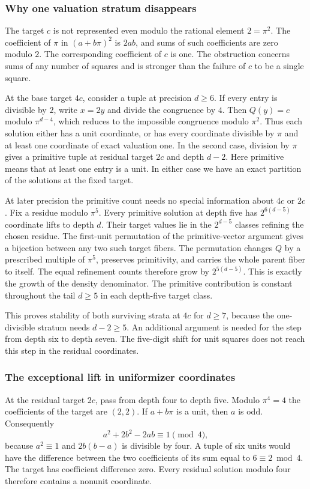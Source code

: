 \documentclass[12pt,letterpaper]{article}
\begin{document}
\subsubsection{Why one valuation stratum disappears}
The target $c$ is not represented even modulo the rational element $2=\pi^2$. The coefficient of $\pi$ in $(a+b\pi)^2$ is $2ab$, and sums of such coefficients are zero modulo $2$. The corresponding coefficient of $c$ is one. The obstruction concerns sums of any number of squares and is stronger than the failure of $c$ to be a single square.

At the base target $4c$, consider a tuple at precision $d\geq 6$. If every entry is divisible by $2$, write $x=2y$ and divide the congruence by $4$. Then $Q(y)=c$ modulo $\pi^{d-4}$, which reduces to the impossible congruence modulo $\pi^2$. Thus each solution either has a unit coordinate, or has every coordinate divisible by $\pi$ and at least one coordinate of exact valuation one. In the second case, division by $\pi$ gives a primitive tuple at residual target $2c$ and depth $d-2$. Here primitive means that at least one entry is a unit. In either case we have an exact partition of the solutions at the fixed target.

At later precision the primitive count needs no special information about $4c$ or $2c$. Fix a residue modulo $\pi^5$. Every primitive solution at depth five has $2^{6(d-5)}$ coordinate lifts to depth $d$. Their target values lie in the $2^{d-5}$ classes refining the chosen residue. The first-unit permutation of the primitive-vector argument gives a bijection between any two such target fibers. The permutation changes $Q$ by a prescribed multiple of $\pi^5$, preserves primitivity, and carries the whole parent fiber to itself. The equal refinement counts therefore grow by $2^{5(d-5)}$. This is exactly the growth of the density denominator. The primitive contribution is constant throughout the tail $d\geq 5$ in each depth-five target class.

This proves stability of both surviving strata at $4c$ for $d\geq 7$, because the one-divisible stratum needs $d-2\geq 5$. An additional argument is needed for the step from depth six to depth seven. The five-digit shift for unit squares does not reach this step in the residual coordinates.

\subsubsection{The exceptional lift in uniformizer coordinates}
At the residual target $2c$, pass from depth four to depth five. Modulo $\pi^4=4$ the coefficients of the target are $(2,2)$. If $a+b\pi$ is a unit, then $a$ is odd. Consequently
\[
 a^2+2b^2-2ab\equiv 1\pmod{4},
\]
because $a^2\equiv 1$ and $2b(b-a)$ is divisible by four. A tuple of six units would have the difference between the two coefficients of its sum equal to $6\equiv 2\bmod 4$. The target has coefficient difference zero. Every residual solution modulo four therefore contains a nonunit coordinate.
\end{document}
